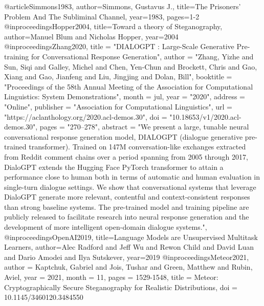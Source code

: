 \documentclass[english,version-2020-11]{uzl-thesis}
\begin{document}
\begin{bibtex-entries}
@article{Simmons1983,
   author={Simmons, Gustavus J.},
   title={The Prisoners' Problem And The Subliminal Channel},
   year=1983,
   pages={1-2}
}
@inproceedings{Hopper2004,
  title={Toward a theory of Steganography},
  author={Manuel Blum and Nicholas Hopper},
  year={2004}
}
@inproceedings{Zhang2020,
    title = "{DIALOGPT} : Large-Scale Generative Pre-training for Conversational Response Generation",
    author = "Zhang, Yizhe  and
      Sun, Siqi  and
      Galley, Michel  and
      Chen, Yen-Chun  and
      Brockett, Chris  and
      Gao, Xiang  and
      Gao, Jianfeng  and
      Liu, Jingjing  and
      Dolan, Bill",
    booktitle = "Proceedings of the 58th Annual Meeting of the Association for Computational Linguistics: System Demonstrations",
    month = jul,
    year = "2020",
    address = "Online",
    publisher = "Association for Computational Linguistics",
    url = "https://aclanthology.org/2020.acl-demos.30",
    doi = "10.18653/v1/2020.acl-demos.30",
    pages = "270--278",
    abstract = "We present a large, tunable neural conversational response generation model, DIALOGPT (dialogue generative pre-trained transformer). Trained on 147M conversation-like exchanges extracted from Reddit comment chains over a period spanning from 2005 through 2017, DialoGPT extends the Hugging Face PyTorch transformer to attain a performance close to human both in terms of automatic and human evaluation in single-turn dialogue settings. We show that conversational systems that leverage DialoGPT generate more relevant, contentful and context-consistent responses than strong baseline systems. The pre-trained model and training pipeline are publicly released to facilitate research into neural response generation and the development of more intelligent open-domain dialogue systems.",
}
@inproceedings{OpenAI2019,
  title={Language Models are Unsupervised Multitask Learners},
  author={Alec Radford and Jeff Wu and Rewon Child and David Luan and Dario Amodei and Ilya Sutskever},
  year={2019}
}
@inproceedings{Meteor2021,
author = {Kaptchuk, Gabriel and Jois, Tushar and Green, Matthew and Rubin, Aviel},
year = {2021},
month = {11},
pages = {1529-1548},
title = {Meteor: Cryptographically Secure Steganography for Realistic Distributions},
doi = {10.1145/3460120.3484550}
}
\end{bibtex-entries}



%
%
%
%
\end{document}

